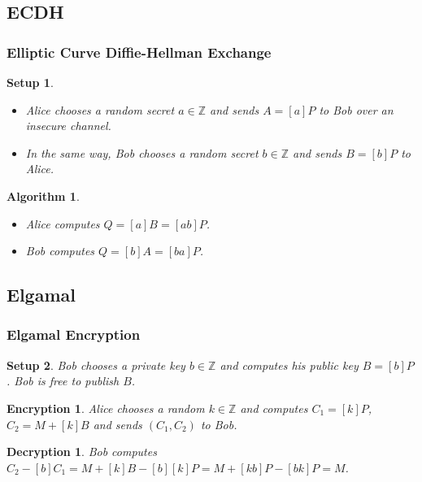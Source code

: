 \documentclass{beamer}
\newtheorem{algorithm}{Algorithm}
\newtheorem{setup}{Setup}
\newtheorem{encryption}{Encryption}
\newtheorem{decryption}{Decryption}
\begin{document}
    \subsection{ECDH}
    \begin{frame}[label=ecdh]
        \frametitle{Elliptic Curve Diffie-Hellman Exchange}
        \begin{setup}
            \begin{itemize}
                \item Alice chooses a random secret \(a \in \mathbb{Z}\) and
                    sends \(A = [a]P\) to Bob over an insecure channel.
                \item In the same way, Bob chooses a random secret
                \(b \in \mathbb{Z}\) and sends \(B = [b]P\) to Alice.
            \end{itemize}
        \end{setup}
        \vfill
        \begin{algorithm}
            \begin{itemize}
                \item Alice computes \(Q = [a]B = [ab]P\).
                \item Bob computes \(Q = [b]A = [ba]P\).
            \end{itemize}
        \end{algorithm}
        \hyperlink{ecdhexample}{}
    \end{frame}

    \subsection{Elgamal}
    \begin{frame}[label=elgamal]
        \frametitle{Elgamal Encryption}
        \begin{setup}
            Bob chooses a private key \(b \in \mathbb{Z}\) and computes
            his public key \(B = [b]P\). Bob is free to publish \(B\).
        \end{setup}
        \vfill
        \begin{encryption}
            Alice chooses a random \(k \in \mathbb{Z}\)
            and computes \(C_1 = [k]P\),
            \(C_2 = M + [k]B\) and sends \((C_1, C_2)\) to Bob.
        \end{encryption}
        \vfill
        \begin{decryption}
            Bob computes \(C_2 - [b]C_1 = M + [k]B - [b][k]P =
            M + [kb]P - [bk]P = M\).
        \end{decryption}
        \hyperlink{elgamalexample}{}
    \end{frame}
\end{document}
